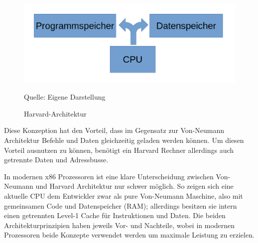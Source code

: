 \documentclass[12pt]{article}
\begin{document}
\begin{figure}[!htb]
\centering
\includegraphics[scale=0.30]{harvard}
\caption{Harvard-Architektur}
\centering
\small Quelle: Eigene Darstellung
\label{fig:harvard}
\end{figure}


\noindent Diese Konzeption hat den Vorteil, dass im Gegensatz zur Von-Neumann Architektur Befehle und Daten gleichzeitig geladen werden können. Um diesen Vorteil ausnutzen zu können, benötigt ein Harvard Rechner allerdings auch getrennte Daten und Adressbusse. 
\par\bigskip
\noindent In modernen x86 Prozessoren ist eine klare Unterscheidung zwischen Von-Neumann und Harvard Architektur nur schwer möglich. So zeigen sich eine aktuelle CPU dem Entwickler zwar als pure Von-Neumann Maschine, also mit gemeinsamen Code und Datenspeicher (RAM); allerdings besitzen sie intern einen getrennten Level-1 Cache für Instruktionen und Daten. Die beiden Architekturprinzipien haben jeweils Vor- und Nachteile, wobei in modernen Prozessoren beide Konzepte verwendet werden um maximale Leistung zu erzielen.
\end{document}

